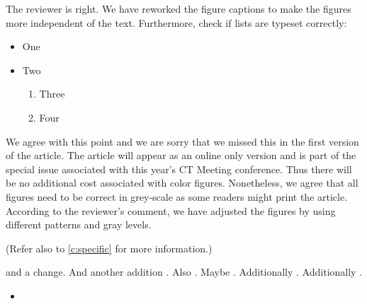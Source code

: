 \documentclass[american,version=last,fromphone,fromemail,svgnames,dvipsnames,x11names]{scrlttr2}
\begin{document}
\begin{rebuttal}
  \begin{comment}
  \label{c:specific}
  You need to include figure captions that make your figures intelligible.
  See~\cref{a:foo} and \cref{c:foo2}.
  \end{comment}

  \begin{answer}
    The reviewer is right. We have reworked the figure captions to make the
    figures more independent of the text. Furthermore, check if lists are
    typeset correctly:
    \begin{itemize}
      \item One
      \item Two
        \begin{enumerate}
          \item Three
          \item Four
        \end{enumerate}
    \end{itemize}
  \end{answer}

  \begin{comment}
    \label{c:c2}
    Are you going to pay for color in the print article? If not, the lines are
    not intelligible in Figures 2, 5, 11. In addition to color coding for the
    digital version, you could make lines with distinct patterns (dots, dashes,
    etc.) so they are distinct in monochrome presentations.
  \end{comment}

  \begin{answer}
    We agree with this point and we are sorry that we missed this in the first
    version of the article. The article will appear as an online only version
    and is part of the special issue associated with this year’s CT Meeting
    conference. Thus there will be no additional cost associated with color
    figures. Nonetheless, we agree that all figures need to be correct in
    grey-scale as some readers might print the article. According to the
    reviewer’s comment, we have adjusted the figures by using different patterns
    and gray levels.

    (Refer also to \cref{c:specific} for more information.)
  \end{answer}
\end{rebuttal}

\lipsum[1] \addition[label=a:foo,ref=c:specific]{\lipsum[2]} \lipsum[3]

\lipsum[4] 
and a  change. And another addition
.
Also .
Maybe .
Additionally .
Additionally .

\begin{additionenv}[label=d:par,ref=c:c2]
  \begin{itemize}
    \item \lipsum[1]
  \end{itemize}
  \lipsum[2]
\end{additionenv}
\end{document}

